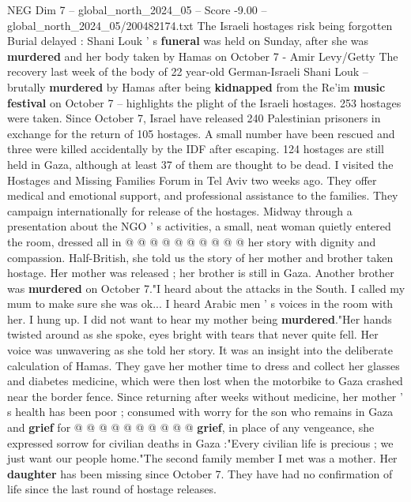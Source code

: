 \begin{textsample}{NEG Dim 7 – global\_north\_2024\_05 – Score -9.00 – global\_north\_2024\_05/200482174.txt}  \label{ex:f7_neg_186}
The Israeli hostages risk being forgotten Burial delayed : Shani Louk ' s \textbf{funeral} was held on Sunday, after she was \textbf{murdered} and her body taken by Hamas on October 7 - Amir Levy/Getty The recovery last week of the body of 22 year-old German-Israeli Shani Louk -- brutally \textbf{murdered} by Hamas after being \textbf{kidnapped} from the Re'im \textbf{music} \textbf{festival} on October 7 -- highlights the plight of the Israeli hostages. 253 hostages were taken.
Since October 7, Israel have released 240 Palestinian prisoners in exchange for the return of 105 hostages.
A small number have been rescued and three were killed accidentally by the IDF after escaping. 124 hostages are still held in Gaza, although at least 37 of them are thought to be dead.
I visited the Hostages and Missing Families Forum in Tel Aviv two weeks ago.
They offer medical and emotional support, and professional assistance to the families.
They campaign internationally for release of the hostages.
Midway through a presentation about the NGO ' s activities, a small, neat woman quietly entered the room, dressed all in @ @ @ @ @ @ @ @ @ @ her story with dignity and compassion.
Half-British, she told us the story of her mother and brother taken hostage.
Her mother was released ; her brother is still in Gaza.
Another brother was \textbf{murdered} on October 7."I heard about the attacks in the South.
I called my mum to make sure she was ok...
I heard Arabic men ' s voices in the room with her.
I hung up.
I did not want to hear my mother being \textbf{murdered}."Her hands twisted around as she spoke, eyes bright with tears that never quite fell.
Her voice was unwavering as she told her story.
It was an insight into the deliberate calculation of Hamas.
They gave her mother time to dress and collect her glasses and diabetes medicine, which were then lost when the motorbike to Gaza crashed near the border fence.
Since returning after weeks without medicine, her mother ' s health has been poor ; consumed with worry for the son who remains in Gaza and \textbf{grief} for @ @ @ @ @ @ @ @ @ @ \textbf{grief}, in place of any vengeance, she expressed sorrow for civilian deaths in Gaza :"Every civilian life is precious ; we just want our people home."The second family member I met was a mother.
Her \textbf{daughter} has been missing since October 7.
They have had no confirmation of life since the last round of hostage releases.

\end{textsample}
